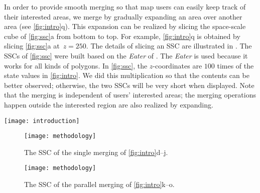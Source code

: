 \documentclass{ica}
\begin{document}
In order to provide smooth merging
so that map users can easily keep track of their interested areas,
we merge by gradually expanding an area over another area
(see \fig\ref{fig:intro}q).
This expansion can be realized 
by slicing the space-scale cube \citep[SSC,][]{vanOosterom2014Support} 
of \fig\ref{fig:ssc}a from bottom to top.
For example,  \fig\ref{fig:intro}q is obtained by slicing
\fig\ref{fig:ssc}a at~$z= 250$.
The details of slicing an SSC are illustrated in \citet{Meijers2020Web}.
The SSCs of \fig\ref{fig:ssc} were built 
based on the \emph{Eater} of \citet{Suba2014Merge}.
The \emph{Eater} is used because it works for all kinds of polygons.
In \fig\ref{fig:ssc}, the $z$-coordinates are $100$ times of
the state values in \fig\ref{fig:intro}.
We did this multiplication so that the contents can be better observed;
otherwise, the two SSCs will be very short when displayed.
Note that the merging is independent of users' interested areas;
the merging operations happen outside the interested region 
are also realized by expanding.





\begin{figure*}[tb]
\centering
\texttt{[image: introduction]}
\caption{A comparison of different scale-transition strategies.
Each arrow inside the subfigures indicates a merging operation.
The arrow in the right-hand side indicates the states of zooming out.
%
(a--c): All changes are processed in one go.
(d--j): All changes are sequenced one by one rapidly.
(k--o): Changes are grouped, resulting in more animation duration for every change.
%
The numbers are the face IDs.
}
\label{fig:intro}
\end{figure*}



\begin{figure*}[htb]
\centering
\begin{subfigure}[t]{0.48\textwidth}
\centering
\texttt{[image: methodology]}
\caption{The SSC of the single merging of \figs\ref{fig:intro}d--j.}
\end{subfigure}
\hfill
\begin{subfigure}[t]{0.48\textwidth}
\centering
\texttt{[image: methodology]}
\caption{The SSC of the parallel merging of \figs\ref{fig:intro}k--o.}
\end{subfigure}
\caption{
In the left SSC, only one merging event is happening 
at a specific state ($z$-dimension), 
while in the right SSC multiple merging events may happen at the same state.
}
\label{fig:ssc}
\end{figure*}
\end{document}
